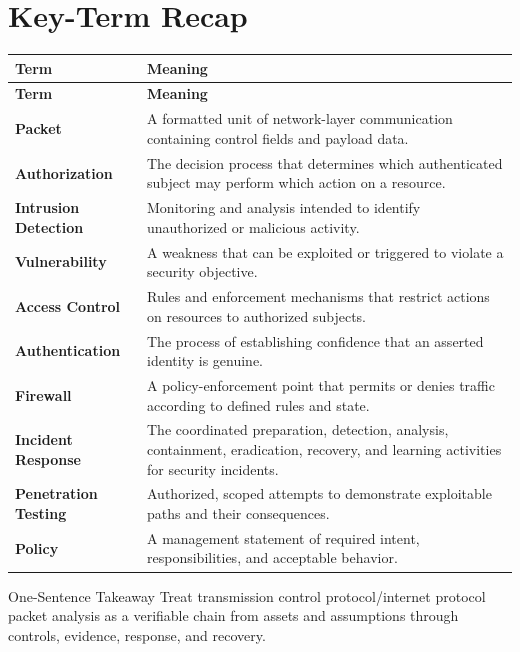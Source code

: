 \documentclass[11pt,letterpaper]{article}
\begin{document}
\section*{Key-Term Recap}
\begin{longtable}{>{\raggedright\arraybackslash}p{}>{\raggedright\arraybackslash}p{}}
\toprule\rowcolor{Navy}\color{white}\textbf{Term} & \color{white}\textbf{Meaning}\\\midrule
\endfirsthead
\toprule\rowcolor{Navy}\color{white}\textbf{Term} & \color{white}\textbf{Meaning}\\\midrule
\endhead
\textbf{Packet} & A formatted unit of network-layer communication containing control fields and payload data. \\\midrule
\textbf{Authorization} & The decision process that determines which authenticated subject may perform which action on a resource. \\\midrule
\textbf{Intrusion Detection} & Monitoring and analysis intended to identify unauthorized or malicious activity. \\\midrule
\textbf{Vulnerability} & A weakness that can be exploited or triggered to violate a security objective. \\\midrule
\textbf{Access Control} & Rules and enforcement mechanisms that restrict actions on resources to authorized subjects. \\\midrule
\textbf{Authentication} & The process of establishing confidence that an asserted identity is genuine. \\\midrule
\textbf{Firewall} & A policy-enforcement point that permits or denies traffic according to defined rules and state. \\\midrule
\textbf{Incident Response} & The coordinated preparation, detection, analysis, containment, eradication, recovery, and learning activities for security incidents. \\\midrule
\textbf{Penetration Testing} & Authorized, scoped attempts to demonstrate exploitable paths and their consequences. \\\midrule
\textbf{Policy} & A management statement of required intent, responsibilities, and acceptable behavior. \\\midrule
\bottomrule
\end{longtable}
\begin{CornellExamBox}{One-Sentence Takeaway}
Treat transmission control protocol/internet protocol packet analysis as a verifiable chain from assets and assumptions through controls, evidence, response, and recovery.
\end{CornellExamBox}
\end{document}
